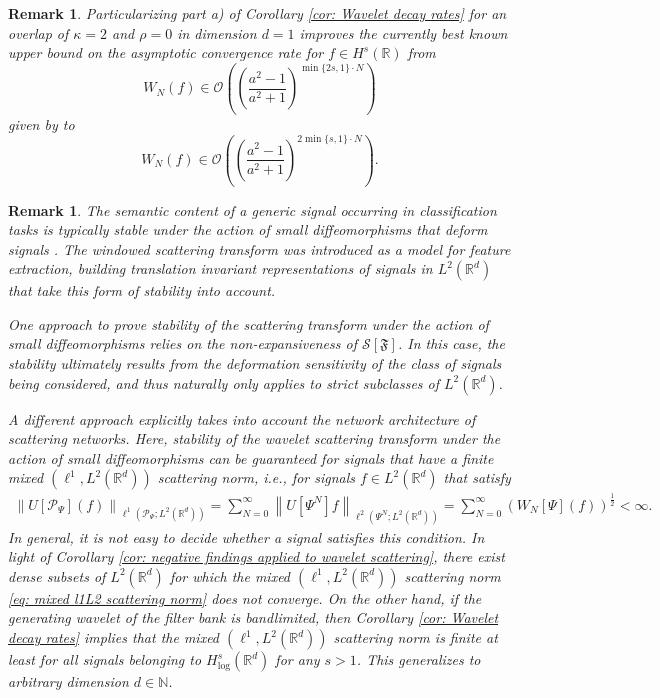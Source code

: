 \documentclass[11pt]{amsart}
\newcommand{\R}{{\mathbb{R}}}
\newcommand{\N}{\mathbb{N}}
\newcommand{\s}{\mathcal{S}}
\newcommand{\norm}[1]{\ensuremath{\left\lVert\text{}#1\text{}\right\rVert}}
\newtheorem{remark}[theorem]{Remark}
\newenvironment{proof sketch} {\textit{Proof sketch.}}{}
\begin{document}
  \begin{remark}
    Particularizing part a) of Corollary \ref{cor: Wavelet decay rates} for an overlap of $\kappa=2$ and $\rho=0$ in dimension $d=1$ improves the currently best known upper bound on the asymptotic convergence rate for $f \in H^s(\R)$ from 
    \[W_N(f)\in \mathcal{O}\left(\left(\frac{a^2-1}{a^2+1}\right)^{\min\{2s,1\}\cdot N}\right)\] 
    given by \cite[Theorem 3.1]{wiatowski2017topology} to 
    \[W_N(f)\in \mathcal{O}\left(\left(\frac{a^2-1}{a^2+1}\right)^{2\min\{s,1\}\cdot N}\right).\]
  \end{remark}
  
  \begin{remark}
    The semantic content of a generic signal occurring in classification tasks is typically stable under the action of small diffeomorphisms that deform signals \cite{mallat2012group,mallat2016understanding}. The windowed scattering transform was introduced as a model for feature extraction, building translation invariant representations of signals in $L^2(\R^d)$ that take this form of stability into account. 
    
    One approach \cite{grohs2016deep,wiatowski2017mathematical,koller2018deformation} to prove stability of the scattering transform under the action of small diffeomorphisms relies on the non-expansiveness of $\s[\mathfrak{F}]$. In this case, the stability ultimately results from the deformation sensitivity of the class of signals being considered, and thus naturally only applies to strict subclasses of $L^2(\R^d)$.
  
    A different approach \cite{mallat2012group,nicola2023stability} explicitly takes into account the network architecture of scattering networks. Here, stability of the wavelet scattering transform under the action of small diffeomorphisms can be guaranteed for signals that have a finite mixed $(\ell^1,L^2(\R^d))$ scattering norm, i.e., for signals $f\in L^2(\R^d)$ that satisfy
    \begin{align}\label{eq: mixed l1L2 scattering norm}
      \norm{U[\mathcal{P}_\Psi](f)}_{\ell^1(\mathcal{P}_\Psi;L^2(\R^d))}=\sum_{N=0}^\infty \norm{U[\Psi^N]f}_{\ell^2(\Psi^N;L^2(\R^d))} = \sum_{N=0}^\infty \left(W_N[\Psi](f)\right)^{\frac{1}{2}}<\infty.
    \end{align}
    In general, it is not easy to decide whether a signal satisfies this condition. 
    In light of Corollary \ref{cor: negative findings applied to wavelet scattering}, there exist dense subsets of $L^2(\R^d)$ for which the mixed $(\ell^1,L^2(\R^d))$ scattering norm \eqref{eq: mixed l1L2 scattering norm} does not converge. On the other hand, if the generating wavelet of the filter bank is bandlimited, then Corollary \ref{cor: Wavelet decay rates} implies that the mixed $(\ell^1,L^2(\R^d))$ scattering norm is finite at least for all signals belonging to $H^s_{\log}(\R^d)$ for any $s>1$. This generalizes \cite[Proposition 2.4]{nicola2023stability} to arbitrary dimension $d \in \N$.
  \end{remark}
  
\end{document}
